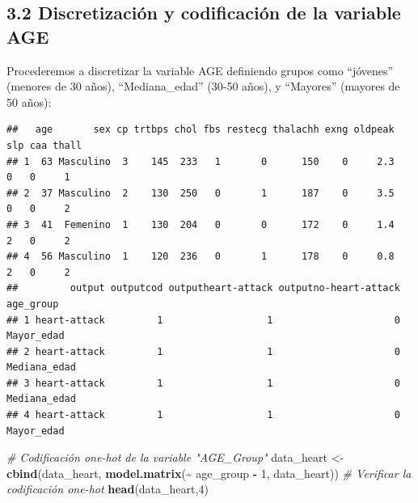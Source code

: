 \documentclass[
]{article}
\newenvironment{Shaded}{\begin{snugshade}}{\end{snugshade}}
\newcommand{\AttributeTok}[1]{\textcolor[rgb]{0.13,0.29,0.53}{#1}}
\newcommand{\CommentTok}[1]{\textcolor[rgb]{0.56,0.35,0.01}{\textit{#1}}}
\newcommand{\ConstantTok}[1]{\textcolor[rgb]{0.56,0.35,0.01}{#1}}
\newcommand{\DecValTok}[1]{\textcolor[rgb]{0.00,0.00,0.81}{#1}}
\newcommand{\FunctionTok}[1]{\textcolor[rgb]{0.13,0.29,0.53}{\textbf{#1}}}
\newcommand{\NormalTok}[1]{#1}
\newcommand{\OtherTok}[1]{\textcolor[rgb]{0.56,0.35,0.01}{#1}}
\newcommand{\SpecialCharTok}[1]{\textcolor[rgb]{0.81,0.36,0.00}{\textbf{#1}}}
\newcommand{\StringTok}[1]{\textcolor[rgb]{0.31,0.60,0.02}{#1}}
\begin{document}
\hypertarget{discretizaciuxf3n-y-codificaciuxf3n-de-la-variable-age}{%
\subsection{3.2 Discretización y codificación de la variable
AGE}\label{discretizaciuxf3n-y-codificaciuxf3n-de-la-variable-age}}

Procederemos a discretizar la variable AGE definiendo grupos como
``jóvenes'' (menores de 30 años), ``Mediana\_edad'' (30-50 años), y
``Mayores'' (mayores de 50 años):

\begin{Shaded}
\end{Shaded}

\begin{verbatim}
##   age       sex cp trtbps chol fbs restecg thalachh exng oldpeak slp caa thall
## 1  63 Masculino  3    145  233   1       0      150    0     2.3   0   0     1
## 2  37 Masculino  2    130  250   0       1      187    0     3.5   0   0     2
## 3  41  Femenino  1    130  204   0       0      172    0     1.4   2   0     2
## 4  56 Masculino  1    120  236   0       1      178    0     0.8   2   0     2
##         output outputcod outputheart-attack outputno-heart-attack    age_group
## 1 heart-attack         1                  1                     0   Mayor_edad
## 2 heart-attack         1                  1                     0 Mediana_edad
## 3 heart-attack         1                  1                     0 Mediana_edad
## 4 heart-attack         1                  1                     0   Mayor_edad
\end{verbatim}

\begin{Shaded}
\begin{Highlighting}[]
\CommentTok{\# Codificación one{-}hot de la variable "AGE\_Group"}
\NormalTok{data\_heart }\OtherTok{\textless{}{-}} \FunctionTok{cbind}\NormalTok{(data\_heart, }\FunctionTok{model.matrix}\NormalTok{(}\SpecialCharTok{\textasciitilde{}}\NormalTok{ age\_group }\SpecialCharTok{{-}} \DecValTok{1}\NormalTok{, data\_heart))}
\CommentTok{\# Verificar la codificación one{-}hot}
\FunctionTok{head}\NormalTok{(data\_heart,}\DecValTok{4}\NormalTok{)}
\end{Highlighting}
\end{Shaded}
\end{document}
